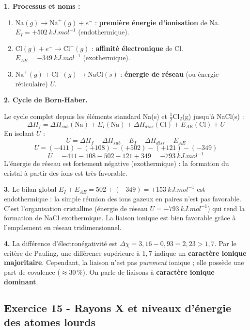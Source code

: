 \documentclass[12pt,a4paper]{article}
\begin{document}
\begin{boitecorrige}
\textbf{1. Processus et noms :}
\begin{enumerate}[label=(\alph*)]
  \item $\text{Na}(g) \to \text{Na}^+(g) + e^-$ : \textbf{première énergie d'ionisation} de Na.\\ $E_I = +\qty{502}{kJ.mol^{-1}}$ (endothermique).
  \item $\text{Cl}(g) + e^- \to \text{Cl}^-(g)$ : \textbf{affinité électronique} de Cl.\\ $E_{AE} = -\qty{349}{kJ.mol^{-1}}$ (exothermique).
  \item $\text{Na}^+(g) + \text{Cl}^-(g) \to \text{NaCl}(s)$ : \textbf{énergie de réseau} (ou énergie réticulaire) $U$.
\end{enumerate}

\textbf{2. Cycle de Born-Haber.}

Le cycle complet depuis les éléments standard Na(s) et $\frac{1}{2}$Cl$_2$(g) jusqu'à NaCl(s) :
\[
\Delta H_f = \Delta H_{sub}(\text{Na}) + E_I(\text{Na}) + \Delta H_{diss}(\text{Cl}) + E_{AE}(\text{Cl}) + U
\]
En isolant $U$ :
\[
U = \Delta H_f - \Delta H_{sub} - E_I - \Delta H_{diss} - E_{AE}
\]
\[
U = (-411) - (+108) - (+502) - (+121) - (-349)
\]
\[
U = -411 - 108 - 502 - 121 + 349 = \boxed{-\qty{793}{kJ.mol^{-1}}}
\]
L'énergie de réseau est fortement négative (exothermique) : la formation du cristal à partir des ions est très favorable.

\textbf{3.} Le bilan global $E_I + E_{AE} = 502 + (-349) = +\qty{153}{kJ.mol^{-1}}$ est endothermique : la simple réunion des ions gazeux en paires n'est pas favorable. C'est l'organisation cristalline (énergie de réseau $U = -\qty{793}{kJ.mol^{-1}}$) qui rend la formation de NaCl exothermique. La liaison ionique est bien favorable grâce à l'empilement en réseau tridimensionnel.

\textbf{4.} La différence d'électronégativité est $\Delta\chi = 3{,}16 - 0{,}93 = 2{,}23 > 1{,}7$. Par le critère de Pauling, une différence supérieure à $1{,}7$ indique un \textbf{caractère ionique majoritaire}. Cependant, la liaison n'est pas \textit{purement} ionique ; elle possède une part de covalence ($\approx 30\,\%$). On parle de liaisons à \textbf{caractère ionique dominant}.
\end{boitecorrige}

\subsection*{Exercice 15 - Rayons X et niveaux d'énergie des atomes lourds \niveau{\difficile}}
\end{document}

